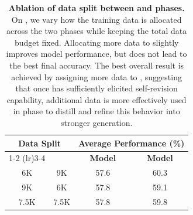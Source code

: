 \def\changesize#1{\fontsize{#1}{10.5pt}\selectfont}
\begin{table}[h]
\centering
\setlength{\tabcolsep}{4pt}
\small
\begin{tabular}{cccc}
\toprule
\multicolumn{2}{c}{\textbf{Data Split}} & \multicolumn{2}{c}{\textbf{Average Performance (\%)}} \\
\cmidrule(lr){1-2} \cmidrule(lr){3-4}
\textbf{\sft{}} & \textbf{\opsd{}} & \textbf{\sft{} Model} & \textbf{\ours{} Model} \\
\midrule
6K & 9K & 57.6 & 60.3 \\
9K &  6K& 57.8 & 59.1 \\
7.5K & 7.5K & 57.8 & 59.8 \\
\bottomrule
\end{tabular}
\caption{\textbf{Ablation of data split between \sft{} and \opsd{} phases.} On \qwen{}, we vary how the training data is allocated across the two phases while keeping the total data budget fixed. Allocating more data to \sft{} slightly improves \sft{} model performance, but does not lead to the best final \ours{} accuracy. The best overall result is achieved by assigning more data to \opsd{}, suggesting that once \sft{} has sufficiently elicited self-revision capability, additional data is more effectively used in \opsd{} phase to distill and refine this behavior into stronger generation.}
\label{tab:data-split-ablation}
\end{table}